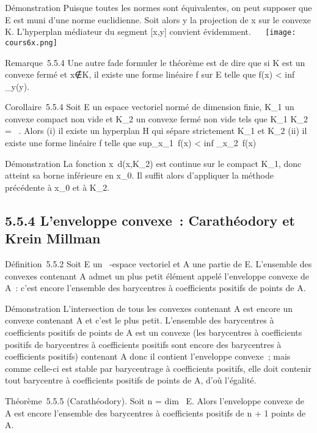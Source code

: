 \documentclass[]{article}
\begin{document}
Démonstration Puisque toutes les normes sont équivalentes, on peut
supposer que E est muni d'une norme euclidienne. Soit alors y la
projection de x sur le convexe K. L'hyperplan médiateur du segment
[x,y] convient évidemment. ~~ \texttt{[image: cours6x.png]}

Remarque~5.5.4 Une autre fa\ccon de formuler le
théorème est de dire que si K est un convexe fermé et
x∉K, il existe une forme linéaire f sur E
telle que f(x) < inf~
_y\inKf(y).

Corollaire~5.5.4 Soit E un espace vectoriel normé de dimension finie,
K_1 un convexe compact non vide et K_2 un convexe
fermé non vide tels que K_1 \bigcap K_2 = \varnothing~. Alors (i) il
existe un hyperplan H qui sépare strictement K_1 et
K_2 (ii) il existe une forme linéaire f telle que
sup_x\inK_1~f(x)
< inf _x\inK_2~f(x)

Démonstration La fonction x\mapsto~d(x,K_2)
est continue sur le compact K_1, donc atteint sa borne
inférieure en x_0. Il suffit alors d'appliquer la méthode
précédente à x_0 et à K_2.

\subsection{5.5.4 L'enveloppe convexe~: Carathéodory et Krein Millman}

Définition~5.5.2 Soit E un ~-espace vectoriel et A une partie de E.
L'ensemble des convexes contenant A admet un plus petit élément appelé
l'enveloppe convexe de A~: c'est encore l'ensemble des barycentres à
coefficients positifs de points de A.

Démonstration L'intersection de tous les convexes contenant A est encore
un convexe contenant A et c'est le plus petit. L'ensemble des
barycentres à coefficients positifs de points de A est un convexe (les
barycentres à coefficients positifs de barycentres à coefficients
positifs sont encore des barycentres à coefficients positifs) contenant
A donc il contient l'enveloppe convexe~; mais comme celle-ci est stable
par barycentrage à coefficients positifs, elle doit contenir tout
barycentre à coefficients positifs de points de A, d'où l'égalité.

Théorème~5.5.5 (Carathéodory). Soit n = dim~ E.
Alors l'enveloppe convexe de A est encore l'ensemble des barycentres à
coefficients positifs de n + 1 points de A.
\end{document}
